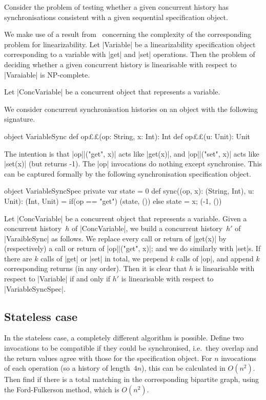 Consider the problem of testing whether a given concurrent history has
synchronisations consistent with a given sequential specification object. 

We make use of a result from~\cite{???} concerning the complexity of the
corresponding problem for linearizability.  Let |Variable| be a
linearizability specification object corresponding to a variable with |get|
and |set| operations.  Then the problem of deciding whether a given concurrent
history is linearisable with respect to |Varaiable| is NP-complete.

Let |ConcVariable| be a concurrent object that represents a variable.  

We consider concurrent synchronisation histories on an object with the
following signature.   
\begin{scala}
object VariableSync{
  def op££(op: String, x: Int): Int
  def op££(u: Unit): Unit
} 
\end{scala}
%
The intention is that |op||("get", x)| acts like |get(x)|, and
|op||("set", x)| acts like |set(x)| (but returns -1).  The |op|
invocations do nothing except synchronise.  This can be captured formally by
the following synchronisation specification object.

\begin{scala}
object VariableSyncSpec{
  private var state = 0
  def sync((op, x): (String, Int), u: Unit): (Int, Unit) = 
    if(op == "get") (state, ()) else{ state = x; (-1, ()) }
}
\end{scala}


Let |ConcVariable| be a concurrent object that represents a variable.  Given a
concurrent history~$h$ of |ConcVariable|, we build a concurrent history~$h'$
of |VaraibleSync| as follows.  We replace every call or return of |get(x)| by
(respectively) a call or return of |op||("get", x)|; and we do similarly
with |set|s.  If there are $k$ calls of |get| or |set| in total, we prepend
$k$ calls of |op|, and append $k$ corresponding returns (in any order).
Then it is clear that $h$ is linearisable with respect to |Variable| if and
only if $h'$ is linearisable with respect to |VariableSyncSpec|.


\subsection{Stateless case}

In the stateless case, a completely different algorithm is possible.  Define
two invocations to be compatible if they could be synchronised, i.e.~they
overlap and the return values agree with those for the specification object.
For $n$ invocations of each operation (so a history of length~$4n$), this can
be calculated in $O(n^2)$.  Then find if there is a total matching in the
corresponding bipartite graph, using the Ford-Fulkerson method, which is
$O(n^2)$.

